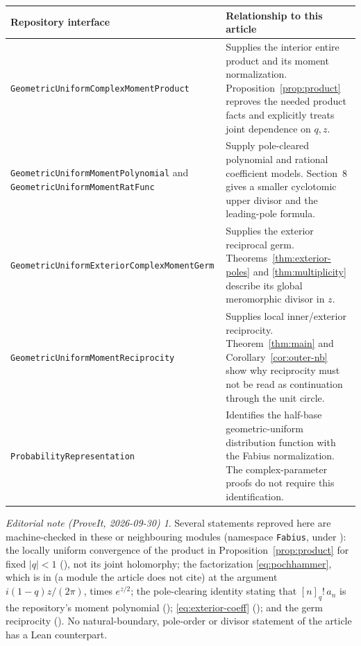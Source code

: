 \documentclass[11pt,a4paper]{article}
\numberwithin{equation}{section}
\theoremstyle{definition}
\theoremstyle{remark}
\newtheorem*{ednote}{Editorial note (ProveIt, 2026-09-30)}
\newcommand{\module}[1]{\texttt{\footnotesize\nolinkurl{#1}}}
\begin{document}
\begin{longtable}{@{}p{}p{}@{}}
\toprule
Repository interface & Relationship to this article\\
\midrule
\endhead
\module{GeometricUniformComplexMomentProduct}
& Supplies the interior entire product and its moment normalization. Proposition~\ref{prop:product} reproves the needed product facts and explicitly treats joint dependence on \(q,z\).\\[5pt]
\module{GeometricUniformMomentPolynomial} and \module{GeometricUniformMomentRatFunc}
& Supply pole-cleared polynomial and rational coefficient models. Section~8 gives a smaller cyclotomic upper divisor and the leading-pole formula.\\[5pt]
\module{GeometricUniformExteriorComplexMomentGerm}
& Supplies the exterior reciprocal germ. Theorems~\ref{thm:exterior-poles} and \ref{thm:multiplicity} describe its global meromorphic divisor in \(z\).\\[5pt]
\module{GeometricUniformMomentReciprocity}
& Supplies local inner/exterior reciprocity. Theorem~\ref{thm:main} and Corollary~\ref{cor:outer-nb} show why reciprocity must not be read as continuation through the unit circle.\\[5pt]
\module{ProbabilityRepresentation}
& Identifies the half-base geometric-uniform distribution function with the Fabius normalization. The complex-parameter proofs do not require this identification.\\
\bottomrule
\end{longtable}
\begin{ednote}
Several statements reproved here are machine-checked in these or neighbouring
modules (namespace \texttt{Fabius}, under
): the locally uniform
convergence of the product in Proposition~\ref{prop:product} for fixed
$|q|<1$ (),
not its joint holomorphy; the factorization \eqref{eq:pochhammer}, which is
 in
 (a module the article does not
cite) at the argument $i(1-q)z/(2\pi)$, times $e^{z/2}$; the pole-clearing
identity stating that $[n]_q!\,a_n$ is the repository's moment polynomial
();
\eqref{eq:exterior-coeff}
();
and the germ reciprocity ().
No natural-boundary, pole-order or divisor statement of the article has a
Lean counterpart.
\end{ednote}
\end{document}
